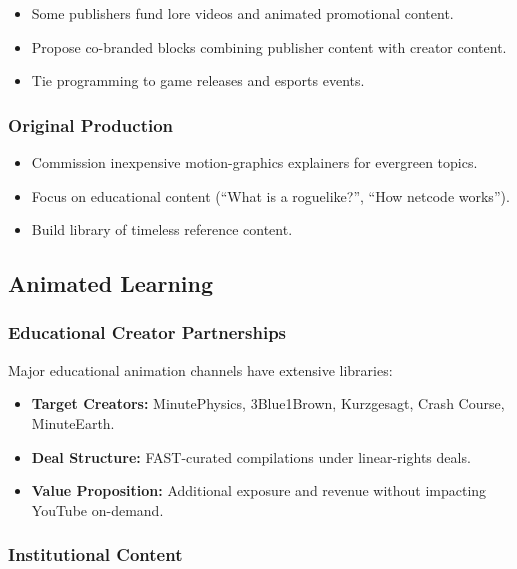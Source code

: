 \documentclass[12pt,letterpaper,twoside]{report}
\begin{document}
\begin{itemize}[leftmargin=1.5cm]
    \item Some publishers fund lore videos and animated promotional content.
    \item Propose co-branded blocks combining publisher content with creator content.
    \item Tie programming to game releases and esports events.
\end{itemize}

\subsubsection{Original Production}

\begin{itemize}[leftmargin=1.5cm]
    \item Commission inexpensive motion-graphics explainers for evergreen topics.
    \item Focus on educational content (``What is a roguelike?'', ``How netcode works'').
    \item Build library of timeless reference content.
\end{itemize}

\subsection{Animated Learning}

\subsubsection{Educational Creator Partnerships}

Major educational animation channels have extensive libraries:

\begin{itemize}[leftmargin=1.5cm]
    \item \textbf{Target Creators:} MinutePhysics, 3Blue1Brown, Kurzgesagt, Crash Course, MinuteEarth.
    \item \textbf{Deal Structure:} FAST-curated compilations under linear-rights deals.
    \item \textbf{Value Proposition:} Additional exposure and revenue without impacting YouTube on-demand.
\end{itemize}

\subsubsection{Institutional Content}
\end{document}
